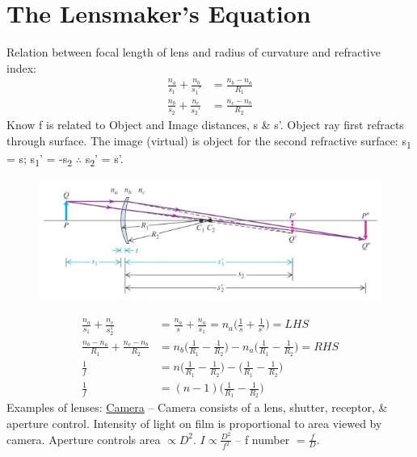 \documentclass[a4paper, 11pt, normalem]{report}
\begin{document}
\section{The Lensmaker's Equation}
Relation between focal length of lens and radius of curvature and refractive index:
\begin{align}
    \frac{n_{a}}{s_{1}} + \frac{n_{b}}{s_{1}'} &= \frac{n_{b} - n_{a}}{R_{1}}\\
    \frac{n_{b}}{s_{2}} + \frac{n_{c}}{s_{2}'} &= \frac{n_{c} - n_{b}}{R_{2}}
\end{align}
Know f is related to Object and Image distances, s \& s'. 
Object ray first refracts through surface.
The image (virtual) is object for the second refractive surface: s\textsubscript{1} = s; s\textsubscript{1}' = -s\textsubscript{2} $\therefore$ s\textsubscript{2}' = s'.
\begin{figure}[H]
    \centering
    \includegraphics{Lensmaker.jpg}
\end{figure}
\begin{align}
    \frac{n_{a}}{s_{1}} + \frac{n_{c}}{s_{2}^{1}} &= \frac{n_{a}}{s} + \frac{n_{a}}{s_{1}} = n_{a}\Big(\frac{1}{s} + \frac{1}{s'}\Big) = LHS \\
    \frac{n_{b} - n_{a}}{R_{1}} + \frac{n_{c} - n_{b}}{R_{2}} &= n_{b}\Big(\frac{1}{R_{1}} - \frac{1}{R_{2}}\Big) - n_{a}\Big(\frac{1}{R_{1}} - \frac{1}{R_{2}}\Big) = RHS \\
    \frac{1}{f} &= n\Big(\frac{1}{R_{1}} - \frac{1}{R_{2}}\Big) - \Big(\frac{1}{R_{1}} - \frac{1}{R_{2}}\Big) \\
    \frac{1}{f} &= (n - 1)\Big(\frac{1}{R_{1}} - \frac{1}{R_{2}}\Big)
\end{align}
Examples of lenses: \underline{Camera} -- 
Camera consists of a lens, shutter, receptor, \& aperture control.
Intensity of light on film is proportional to area viewed by camera.
Aperture controls area $\propto D^{2}$.
$I \propto \frac{D^{2}}{f^{2}}$ -- f number $= \frac{f}{D}$.
\end{document}
